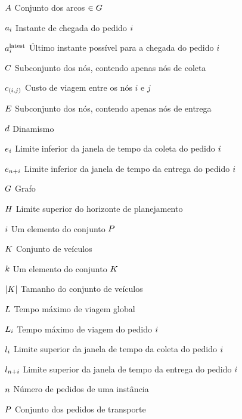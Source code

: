 


\begin{simbolos}
    \item[$A$]{Conjunto dos arcos $\in G$}
  \item[$a_i$] Instante de chegada do pedido $i$
    \item[$a{}_{i{}}^{\mathrm{latest}}$]
      Último instante possível para a chegada do pedido $i$
    \item[$C$] Subconjunto dos nós, contendo apenas nós de coleta
    \item[$c_{(i,j)}$] Custo de viagem entre os nós $i$ e $j$
    \item[$E$] Subconjunto dos nós, contendo apenas nós de entrega
    \item[$d$] Dinamismo
    \item[$e_{i}$]
      Limite inferior da janela de tempo da coleta do pedido $i$
    \item[$e_{n + i}$]
      Limite inferior da janela de tempo da entrega do pedido $i$
    \item[$G$] Grafo
    \item[$H$] Limite superior do horizonte de planejamento
    \item[$i$] Um elemento do conjunto $P$
    \item[$K$] Conjunto de veículos
    \item[$k$] Um elemento do conjunto $K$
    \item[$|K|$] Tamanho do conjunto de veículos
    \item[$L$] Tempo máximo de viagem global
    \item[$L_i$] Tempo máximo de viagem do pedido 
      $i$
    \item[$l_{i}$]
      Limite superior da janela de tempo da coleta do pedido $i$
    \item[$l_{n + i}$]
      Limite superior da janela de tempo da entrega do pedido $i$
    \item[$n$] Número de pedidos de uma instância
    \item[$P$] Conjunto dos pedidos de transporte 

\end{simbolos}
